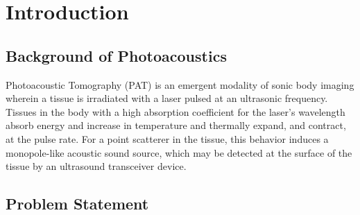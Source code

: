 \chapter{Introduction} 
\label{chapter1:introduction}
\graphicspath{{Chapter-1/graphics/}}

\section{Background of Photoacoustics}
\label{chapter1:backg_photoacoustics}

Photoacoustic Tomography (PAT) is an emergent modality of sonic body imaging wherein a tissue is irradiated with a laser pulsed at an ultrasonic frequency. Tissues in the body with a high absorption coefficient for the laser's wavelength absorb energy and increase in temperature and thermally expand, and contract, at the pulse rate. For a point scatterer in the tissue, this behavior induces a monopole-like acoustic sound source, which may be detected at the surface of the tissue by an ultrasound transceiver device.

\section{Problem Statement}
\label{chapter1:problem_statement}



